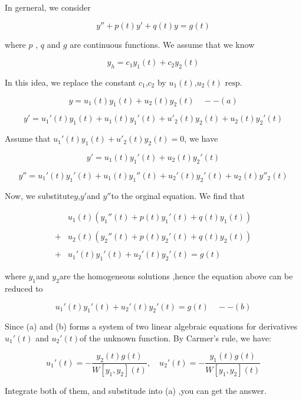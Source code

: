 \documentclass[12pt, a4paper]{article}
\theoremstyle{break}
\begin{document}
In gerneral, we consider

\[
y'' + p(t)y' + q(t)y = g(t)
\]

where \(p\) , \(q\) and \(g\) are continuous functions. We assume that we know

\[
y_h = c_1y_1(t) + c_2 y_2(t)
\]

In this idea, we replace the constant \(c_1\),\(c_2\) by \(u_1(t)\),\(u_2(t)\) \(\text{resp.}\)

\[
y = u_1(t) y_1(t) + u_2(t) y_2(t) \quad --(a)
\]

\[
y' = u_1'(t) y_1(t) + u_1(t)y_1'(t) + u'_2(t) y_2(t) + u_2(t)y_2'(t)
\]

Assume that \(u_1'(t) y_1(t) + u'_2(t) y_2(t) = 0\), we have

\[
y' =  u_1(t)y_1'(t) + u_2(t)y_2'(t)
\]

\[
y'' = u_1'(t)y_1'(t) + u_1(t) y_1''(t) + u_2'(t)y_2'(t) + u_2(t)y''_2(t)
\]

Now, we substitute\(y\),\(y'\)and \(y''\)to the orginal equation. We find that

\[
\begin{aligned}
&u_1(t) \left( y_1''(t) + p(t)y_1'(t) + q(t)y_1(t) \right) \\\\
+&u_2(t) \left( y_2''(t) + p(t)y_2'(t) + q(t)y_2(t) \right) \\\\
+&u_1'(t)y_1'(t) + u_2'(t)y_2'(t) = g(t)
\end{aligned}
\]

where \(y_1\)and \(y_2\)are the homogeneous solutions ,hence the equation above can be reduced to

\[
u_1'(t)y_1'(t) +u_2'(t)y_2'(t)
= g(t) \quad --(b)
\]

Since (a) and (b) forms a system of two linear algebraic equations for derivatives \(u_1'(t)\) and \(u_2'(t)\)of the unknown function. By Carmer's rule, we have:

\[
u_1'(t) = -\frac{y_2(t)g(t)}{W[y_1 ,y_2](t)} ,\quad u_2'(t) = -\frac{y_1(t)g(t)}{W[y_1 ,y_2](t)}
\]

Integrate both of them, and substitude into (a) ,you can get the answer.
\end{document}
